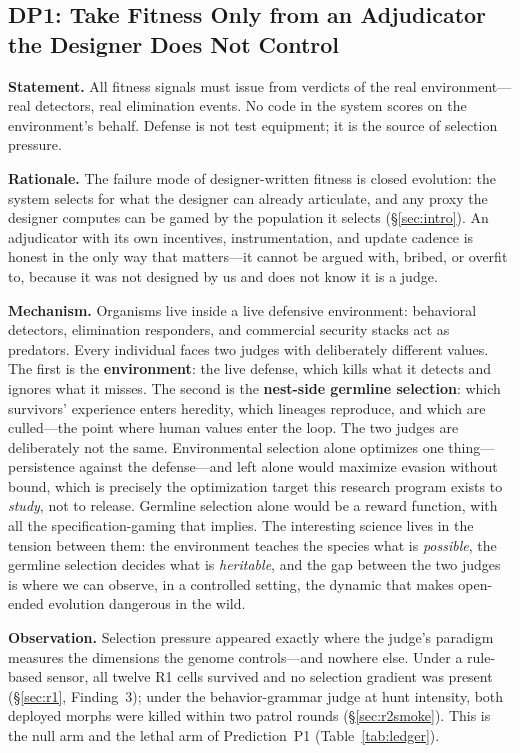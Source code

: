 \documentclass[11pt,a4paper]{article}
\begin{document}
\subsection{DP1: Take Fitness Only from an Adjudicator the Designer Does Not Control}
\label{dp:real}\label{sec:double}

\noindent\textbf{Statement.} All fitness signals must issue from verdicts of the real environment---real detectors, real elimination events. No code in the system scores on the environment's behalf. Defense is not test equipment; it is the source of selection pressure.

\noindent\textbf{Rationale.} The failure mode of designer-written fitness is closed evolution: the system selects for what the designer can already articulate, and any proxy the designer computes can be gamed by the population it selects (\S\ref{sec:intro}). An adjudicator with its own incentives, instrumentation, and update cadence is honest in the only way that matters---it cannot be argued with, bribed, or overfit to, because it was not designed by us and does not know it is a judge.

\noindent\textbf{Mechanism.} Organisms live inside a live defensive environment: behavioral detectors, elimination responders, and commercial security stacks act as predators. Every individual faces two judges with deliberately different values. The first is the \textbf{environment}: the live defense, which kills what it detects and ignores what it misses. The second is the \textbf{nest-side germline selection}: which survivors' experience enters heredity, which lineages reproduce, and which are culled---the point where human values enter the loop. The two judges are deliberately not the same. Environmental selection alone optimizes one thing---persistence against the defense---and left alone would maximize evasion without bound, which is precisely the optimization target this research program exists to \emph{study}, not to release. Germline selection alone would be a reward function, with all the specification-gaming that implies. The interesting science lives in the tension between them: the environment teaches the species what is \emph{possible}, the germline selection decides what is \emph{heritable}, and the gap between the two judges is where we can observe, in a controlled setting, the dynamic that makes open-ended evolution dangerous in the wild.

\noindent\textbf{Observation.} Selection pressure appeared exactly where the judge's paradigm measures the dimensions the genome controls---and nowhere else. Under a rule-based sensor, all twelve R1 cells survived and no selection gradient was present (\S\ref{sec:r1}, Finding~3); under the behavior-grammar judge at hunt intensity, both deployed morphs were killed within two patrol rounds (\S\ref{sec:r2smoke}). This is the null arm and the lethal arm of Prediction~P1 (Table~\ref{tab:ledger}).
\end{document}

